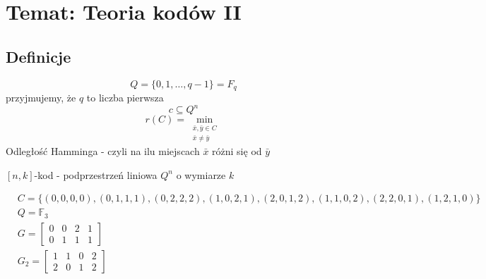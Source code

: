 \section[Wykład 11: 25-V-2017 - Temat: Teoria kodów II]{Temat: Teoria kodów II}
\subsection{Definicje}
$$Q=\{0,1,\dots,q-1\}=F_q$$
przyjmujemy, że $q$ to liczba pierwsza
$$c\subseteq Q^n$$
$$r(C)=\min_{\begin{matrix}
\bar{x},\bar{y}\in C\\
\bar{x}\neq\bar{y}
\end{matrix}}$$
Odległość Hamminga - czyli na ilu miejscach $\bar{x}$ różni się od $\bar{y}$

$[n,k]$-kod - podprzestrzeń liniowa $Q^n$ o wymiarze $k$

\begin{example*}
\begin{align*}
&C=\{(0,0,0,0),(0,1,1,1),(0,2,2,2),(1,0,2,1),(2,0,1,2),(1,1,0,2),(2,2,0,1),(1,2,1,0)\}\\
&Q=\mathbb{F}_3\\
&G=\begin{bmatrix}
0&0&2&1\\0&1&1&1
\end{bmatrix}\\
&G_2=\begin{bmatrix}
1&1&0&2\\2&0&1&2
\end{bmatrix}
\end{align*}
\end{example*}

